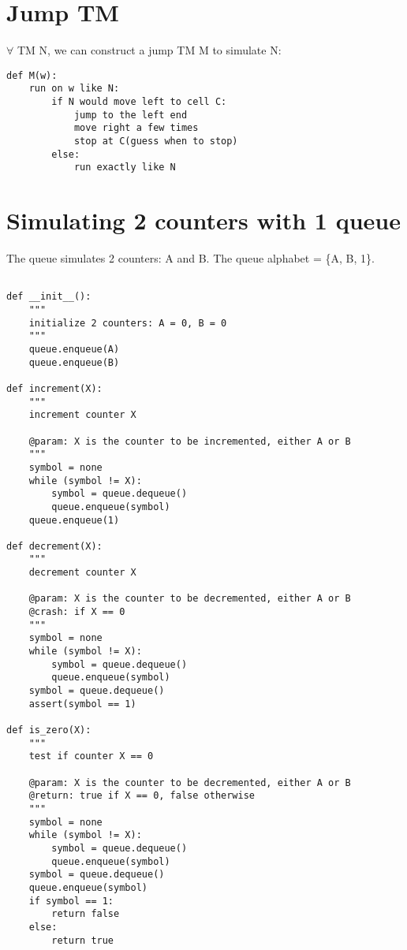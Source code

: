 \documentclass{article}
\begin{document}
\section{Jump TM}

$ \forall$ TM N, we can construct a jump TM M to simulate N:
\begin{lstlisting}
def M(w):
	run on w like N:
		if N would move left to cell C:
			jump to the left end
			move right a few times
			stop at C(guess when to stop)
		else:
			run exactly like N
\end{lstlisting}

\section{Simulating 2 counters with 1 queue}
The queue simulates 2 counters: A and B. The queue alphabet = \{A, B, 1\}.
\begin{lstlisting}

def __init__():
	"""
	initialize 2 counters: A = 0, B = 0
	"""
	queue.enqueue(A)
	queue.enqueue(B)
	
def increment(X):
	"""
	increment counter X
	
	@param: X is the counter to be incremented, either A or B
	"""
	symbol = none
	while (symbol != X):
		symbol = queue.dequeue()
		queue.enqueue(symbol)
	queue.enqueue(1)

def decrement(X):
	"""
	decrement counter X
	
	@param: X is the counter to be decremented, either A or B
	@crash: if X == 0
	"""
	symbol = none
	while (symbol != X):
		symbol = queue.dequeue()
		queue.enqueue(symbol)
	symbol = queue.dequeue()
	assert(symbol == 1)
	
def is_zero(X):
	"""
	test if counter X == 0
	
	@param: X is the counter to be decremented, either A or B
	@return: true if X == 0, false otherwise
	"""
	symbol = none
	while (symbol != X):
		symbol = queue.dequeue()
		queue.enqueue(symbol)
	symbol = queue.dequeue()	
	queue.enqueue(symbol)
	if symbol == 1:
		return false
	else:
		return true
	
\end{lstlisting}	
\end{document}
